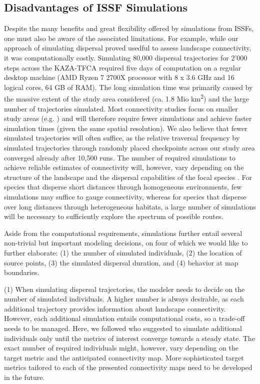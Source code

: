 \documentclass[abstract=on,10pt,a4paper,bibliography=totocnumbered]{article}
\begin{document}
\subsection{Disadvantages of ISSF Simulations}
Despite the many benefits and great flexibility offered by simulations from
ISSFs, one must also be aware of the associated limitations. For example, while
our approach of simulating dispersal proved usedful to assess landscape
connectivity, it was computationally costly. Simulating 80,000 dispersal
trajectories for 2'000 steps across the KAZA-TFCA required five days of
computation on a regular desktop machine (AMD Ryzen 7 2700X processor with 8 x
3.6 GHz and 16 logical cores, 64 GB of RAM). The long simulation time was
primarily caused by the massive extent of the study area considered (ca. 1.8 Mio
km\textsuperscript{2}) and the large number of trajectories simulated. Most
connectivity studies focus on smaller study areas (e.g. \citealp{Kanagaraj.2013,
Clark.2015, McClure.2016, Abrahms.2017, Zeller.2020}) and will therefore require
fewer simulations and achieve faster simulation times (given the same spatial
resolution). We also believe that fewer simulated trajectories will often
suffice, as the relative traversal frequency by simulated trajectories through
randomly placed checkpoints across our study area converged already after 10,500
runs. The number of required simulations to achieve reliable estimates of
connectivity will, however, vary depending on the structure of the landscape and
the dispersal capabilities of the focal species \citep{Gustafson.1996}. For
species that disperse short distances through homogeneous environments, few
simulations may suffice to gauge connectivity, whereas for species that disperse
over long distances through heterogeneous habitats, a large number of
simulations will be necessary to sufficiently explore the spectrum of possible
routes.

Aside from the computational requirements, simulations further entail several
non-trivial but important modeling decisions, on four of which we would like to
further elaborate: (1) the number of simulated individuals, (2) the location of
source points, (3) the simulated dispersal duration, and (4) behavior at map
boundaries.

(1) When simulating dispersal trajectories, the modeler needs to decide on the
number of simulated individuals. A higher number is always desirable, as each
additional trajectory provides information about landscape connectivity.
However, each additional simulation entails computational costs, so a trade-off
needs to be managed. Here, we followed \cite{Signer.2017} who suggested to
simulate additional individuals only until the metrics of interest converge
towards a steady state. The exact number of required individuals might, however,
vary depending on the target metric and the anticipated connectivity map. More
sophisticated target metrics tailored to each of the presented connectivity
maps need to be developed in the future.
\end{document}
